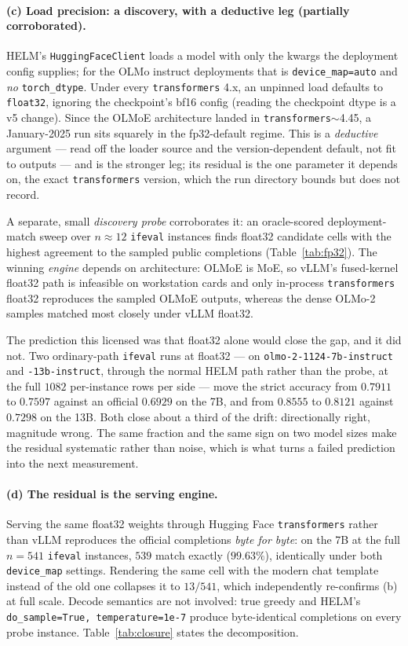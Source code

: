 \paragraph{(c) Load precision: a discovery, with a deductive leg (partially
corroborated).} HELM's \texttt{HuggingFaceClient} loads a model with only the kwargs
the deployment config supplies; for the OLMo instruct deployments that is
\texttt{device\_map=auto} and \emph{no} \texttt{torch\_dtype}. Under every
\texttt{transformers} 4.x, an unpinned load defaults to \texttt{float32}, ignoring the
checkpoint's bf16 config (reading the checkpoint dtype is a v5 change). Since the
OLMoE architecture landed in \texttt{transformers}${\sim}$4.45, a January-2025 run
sits squarely in the fp32-default regime. This is a \emph{deductive} argument ---
read off the loader source and the version-dependent default, not fit to outputs
--- and is the stronger leg; its residual is the one parameter it depends on, the
exact \texttt{transformers} version, which the run directory bounds but does not
record.

A separate, small \emph{discovery probe} corroborates it: an oracle-scored
deployment-match sweep over $n\approx 12$ \texttt{ifeval} instances finds float32
candidate cells with the highest agreement to the sampled public completions
(Table~\ref{tab:fp32}). The winning \emph{engine} depends on architecture:
OLMoE is MoE, so vLLM's fused-kernel float32 path is infeasible on workstation
cards and only in-process \texttt{transformers} float32 reproduces the sampled
OLMoE outputs, whereas the dense OLMo-2 samples matched most closely under vLLM
float32.

The prediction this licensed was that float32 alone would close the gap, and it
did not. Two ordinary-path \texttt{ifeval} runs at float32 --- on
\texttt{olmo-2-1124-7b-instruct} and \texttt{-13b-instruct}, through the normal
HELM path rather than the probe, at the full $1082$ per-instance rows per side ---
move the strict accuracy from $0.7911$ to $0.7597$ against an official $0.6929$ on
the 7B, and from $0.8555$ to $0.8121$ against $0.7298$ on the 13B. Both close
about a third of the drift: directionally right, magnitude wrong. The same
fraction and the same sign on two model sizes make the residual systematic rather
than noise, which is what turns a failed prediction into the next measurement.

\paragraph{(d) The residual is the serving engine.} Serving the same float32
weights through Hugging Face \texttt{transformers} rather than vLLM reproduces the
official completions \emph{byte for byte}: on the 7B at the full $n=541$
\texttt{ifeval} instances, $539$ match exactly ($99.63\%$), identically under both
\texttt{device\_map} settings. Rendering the same cell with the modern chat
template instead of the old one collapses it to $13/541$, which independently
re-confirms (b) at full scale. Decode semantics are not involved: true greedy and
HELM's \texttt{do\_sample=True, temperature=1e-7} produce byte-identical
completions on every probe instance. Table~\ref{tab:closure} states the
decomposition.

